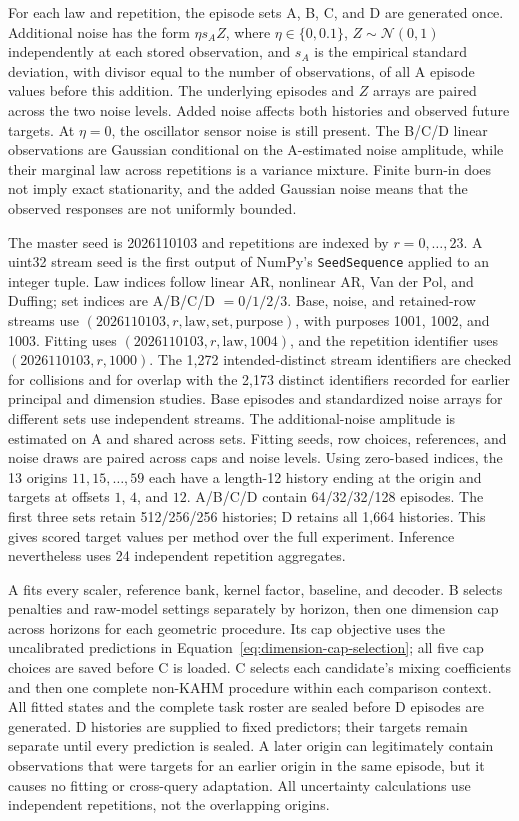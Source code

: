 For each law and repetition, the episode sets A, B, C, and D are generated
once. Additional noise has the form $\eta s_A Z$, where
$\eta\in\{0,0.1\}$, $Z\sim\mathcal N(0,1)$ independently at each
stored observation, and $s_A$ is the empirical standard deviation, with
divisor equal to the number of observations, of
all A episode values before this addition. The underlying episodes and
$Z$ arrays are paired across the two noise levels. Added noise affects
both histories and observed future targets. At $\eta=0$, the oscillator
sensor noise is still present. The B/C/D linear observations are Gaussian
conditional on the A-estimated noise amplitude, while their marginal law
across repetitions is a variance mixture. Finite burn-in does not imply
exact stationarity, and the added Gaussian noise means that the observed
responses are not uniformly bounded.

The master seed is 2026110103 and repetitions are indexed by
$r=0,\ldots,23$. A uint32 stream seed is the first output of NumPy's
\texttt{SeedSequence} applied to an integer tuple. Law indices follow
linear AR, nonlinear AR, Van der Pol, and Duffing; set indices are
A/B/C/D $=0/1/2/3$. Base, noise, and retained-row streams use
$(2026110103,r,\mathrm{law},\mathrm{set},\mathrm{purpose})$, with
purposes 1001, 1002, and 1003. Fitting uses
$(2026110103,r,\mathrm{law},1004)$, and the repetition identifier uses
$(2026110103,r,1000)$. The 1,272 intended-distinct stream identifiers
are checked for collisions and for overlap with the 2,173 distinct
identifiers recorded for earlier principal and dimension studies.
Base episodes and standardized noise arrays for different sets use
independent streams. The additional-noise amplitude is estimated on A
and shared across sets. Fitting seeds, row choices, references, and noise
draws are paired across caps and noise levels. Using zero-based indices, the
13 origins $11,15,\ldots,59$ each have a length-12 history ending at the
origin and targets at offsets $1$, $4$, and $12$. A/B/C/D contain
64/32/32/128 episodes. The first three sets retain 512/256/256 histories;
D retains all 1,664 histories. This gives \DFTargetCells{} scored target
values per method over the full experiment. Inference nevertheless uses
24 independent repetition aggregates.

A fits every scaler, reference bank, kernel factor, baseline, and decoder.
B selects penalties and raw-model settings separately by horizon, then
one dimension cap across horizons for each geometric procedure. Its
cap objective uses the uncalibrated predictions in
Equation~\eqref{eq:dimension-cap-selection}; all five cap choices are
saved before C is loaded. C selects each candidate's mixing coefficients
and then one complete non-KAHM procedure within each comparison context.
All fitted states and the complete task roster are sealed before D
episodes are generated. D histories are supplied to fixed predictors;
their targets remain separate until every prediction is sealed. A later
origin can legitimately contain observations that were targets for an
earlier origin in the same episode, but it causes no fitting or
cross-query adaptation. All uncertainty calculations use independent
repetitions, not the overlapping origins.

